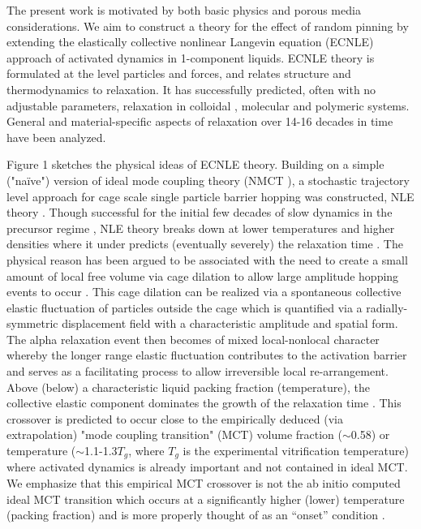 \documentclass[twocolumn,showpacs,preprintnumbers,amsmath,amssymb,unsortedaddress,
]{revtex4-1}
\begin{document}
The present work is motivated by both basic physics and porous media considerations. We aim to construct a theory for the effect of random pinning by extending the elastically collective nonlinear Langevin equation (ECNLE) approach \cite{7,8,30} of activated dynamics in 1-component liquids. ECNLE theory is formulated at the level particles and forces, and relates structure and thermodynamics to relaxation. It has successfully predicted, often with no adjustable parameters, relaxation in colloidal \cite{8,30}, molecular \cite{7,8} and polymeric \cite{31,32} systems. General and material-specific aspects of relaxation over 14-16 decades in time have been analyzed.

Figure 1 sketches the physical ideas of ECNLE theory. Building on a simple ("{na\"ive}") version of ideal mode coupling theory (NMCT \cite{13,33}), a stochastic trajectory level approach for cage scale single particle barrier hopping was constructed, NLE theory \cite{10,33}. Though successful for the initial few decades of slow dynamics in the precursor regime \cite{20,24}, NLE theory breaks down at lower temperatures and higher densities where it under predicts (eventually severely) the relaxation time \cite{7,8}. The physical reason has been argued to be associated with the need to create a small amount of local free volume via cage dilation to allow large amplitude hopping events to occur \cite{7,11,30}. This cage dilation can be realized via a spontaneous collective elastic fluctuation of particles outside the cage which is quantified via a radially-symmetric displacement field with a characteristic amplitude and spatial form. The alpha relaxation event then becomes of mixed local-nonlocal character whereby the longer range elastic fluctuation contributes to the activation barrier and serves as a facilitating process to allow irreversible local re-arrangement. Above (below) a characteristic liquid packing fraction (temperature), the collective elastic component dominates the growth of the relaxation time \cite{7,8}. This crossover is predicted to occur close to the empirically deduced (via extrapolation) "mode coupling transition" (MCT) volume fraction ($\sim$0.58) or temperature ($\sim$1.1-1.3$T_g$, where $T_g$ is the experimental vitrification temperature) where activated dynamics is already important and not contained in ideal MCT. We emphasize that this empirical MCT crossover is not the ab initio computed ideal MCT transition which occurs at a significantly higher (lower) temperature (packing fraction) and is more properly thought of as an “onset” condition \cite{3,7}.
\end{document}
